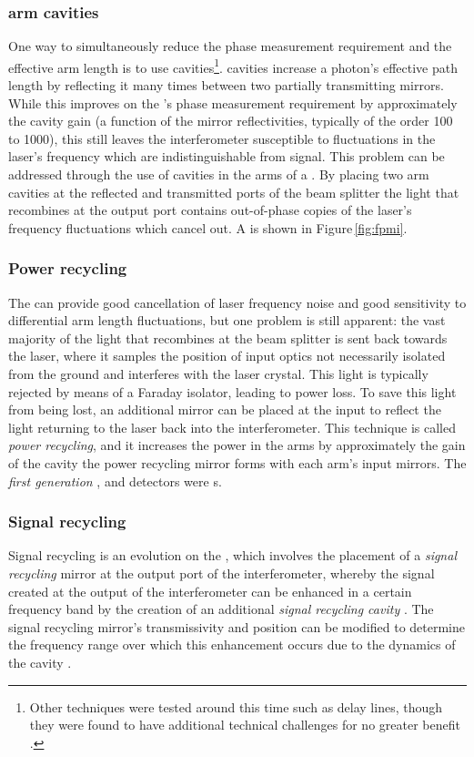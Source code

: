 \subsubsection{\label{sec:fabry-perot-cavities}\FP{} arm cavities}
One way to simultaneously reduce the phase measurement requirement and the effective arm length is to use \FP{} cavities\footnote{Other techniques were tested around this time such as delay lines, though they were found to have additional technical challenges for no greater benefit .}. \FP{} cavities increase a photon's effective path length by reflecting it many times between two partially transmitting mirrors. While this improves on the \MI{}'s phase measurement requirement by approximately the cavity gain (a function of the mirror reflectivities, typically of the order \num{100} to \num{1000}), this still leaves the interferometer susceptible to fluctuations in the laser's frequency which are indistinguishable from signal. This problem can be addressed through the use of \FP{} cavities in the arms of a \MI{}. By placing two arm cavities at the reflected and transmitted ports of the beam splitter the light that recombines at the output port contains out-of-phase copies of the laser's frequency fluctuations which cancel out. A \emph{\FPMI{}} is shown in Figure\,\ref{fig:fpmi}.

\subsubsection{\label{sec:power-recycling}Power recycling}
The \FPMI{} can provide good cancellation of laser frequency noise and good sensitivity to differential arm length fluctuations, but one problem is still apparent: the vast majority of the light that recombines at the beam splitter is sent back towards the laser, where it samples the position of input optics not necessarily isolated from the ground and interferes with the laser crystal. This light is typically rejected by means of a Faraday isolator, leading to power loss. To save this light from being lost, an additional mirror can be placed at the input to reflect the light returning to the laser back into the interferometer. This technique is called \emph{power recycling}, and it increases the power in the arms by approximately the gain of the cavity the power recycling mirror forms with each arm's input mirrors. The \emph{first generation} \ILIGO{}, \IVIRGO{} and \IVIRGO{} detectors were \PRFPMI{}s.

\subsubsection{\label{sec:signal-recycling}Signal recycling}
Signal recycling is an evolution on the \PRFPMI{}, which involves the placement of a \emph{signal recycling} mirror at the output port of the interferometer, whereby the signal created at the output of the interferometer can be enhanced in a certain frequency band by the creation of an additional \emph{signal recycling cavity} \cite{Meers1988}. The signal recycling mirror's transmissivity and position can be modified to determine the frequency range over which this enhancement occurs due to the dynamics of the cavity \cite{Buonanno2001}.

